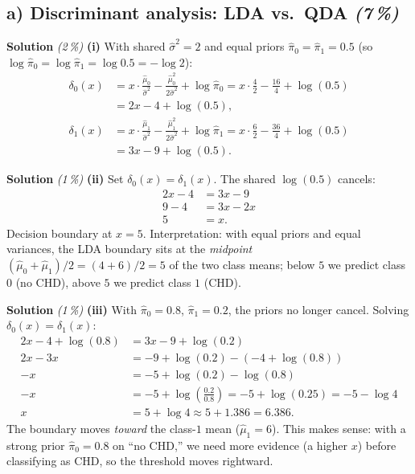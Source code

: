 \documentclass[11pt,a4paper]{article}
\newcommand{\subpoints}[1]{\textit{(#1\,\%)}}
\newcommand{\sol}{\noindent\textbf{Solution}}
\begin{document}
\subsection*{a) Discriminant analysis: LDA vs.\ QDA \subpoints{7}}

\sol{} \subpoints{2} \textbf{(i)} With shared $\hat\sigma^2 = 2$ and equal priors $\hat\pi_0=\hat\pi_1=0.5$
(so $\log\hat\pi_0=\log\hat\pi_1=\log 0.5 = -\log 2$):
\begin{align*}
\delta_0(x) &= x\cdot\frac{\hat\mu_0}{\hat\sigma^2} - \frac{\hat\mu_0^2}{2\hat\sigma^2} + \log\hat\pi_0
   = x\cdot\frac{4}{2} - \frac{16}{4} + \log(0.5) \\
   &= 2x - 4 + \log(0.5), \\[4pt]
\delta_1(x) &= x\cdot\frac{\hat\mu_1}{\hat\sigma^2} - \frac{\hat\mu_1^2}{2\hat\sigma^2} + \log\hat\pi_1
   = x\cdot\frac{6}{2} - \frac{36}{4} + \log(0.5) \\
   &= 3x - 9 + \log(0.5).
\end{align*}

\medskip
\sol{} \subpoints{1} \textbf{(ii)} Set $\delta_0(x)=\delta_1(x)$. The shared $\log(0.5)$ cancels:
\begin{align*}
2x - 4 &= 3x - 9 \\
9 - 4 &= 3x - 2x \\
5 &= x.
\end{align*}
Decision boundary at $\boxed{x=5}$. Interpretation: with equal priors and equal variances, the LDA boundary
sits at the \emph{midpoint} $(\hat\mu_0 + \hat\mu_1)/2 = (4+6)/2 = 5$ of the two class means; below $5$ we
predict class $0$ (no CHD), above $5$ we predict class $1$ (CHD).

\medskip
\sol{} \subpoints{1} \textbf{(iii)} With $\hat\pi_0=0.8$, $\hat\pi_1=0.2$, the priors no longer cancel.
Solving $\delta_0(x)=\delta_1(x)$:
\begin{align*}
2x - 4 + \log(0.8) &= 3x - 9 + \log(0.2) \\
2x - 3x &= -9 + \log(0.2) - (-4 + \log(0.8)) \\
-x &= -5 + \log(0.2) - \log(0.8) \\
-x &= -5 + \log\!\left(\tfrac{0.2}{0.8}\right) = -5 + \log(0.25) = -5 - \log 4 \\
x &= 5 + \log 4 \approx 5 + 1.386 = \boxed{6.386}.
\end{align*}
The boundary moves \emph{toward} the class-$1$ mean ($\hat\mu_1=6$). This makes sense: with a strong prior
$\hat\pi_0=0.8$ on ``no CHD,'' we need more evidence (a higher $x$) before classifying as CHD, so the
threshold moves rightward.
\end{document}
